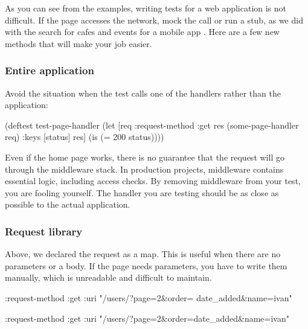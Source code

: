 \fi


As you can see from the examples, writing tests for a web application is not difficult. If the page accesses the network, mock the call or run a stub, as we did with the search for cafes and events for a mobile app . Here are a few new methods that will make your job easier.

\subsubsection*{Entire application}

Avoid the situation when the test calls one of the handlers  rather than the application:

\begin{english}
  \begin{clojure/lines}
(deftest test-page-handler
  (let [req {:request-method :get}
        res (some-page-handler req)
        {:keys [status]} res]
    (is (= 200 status))))
  \end{clojure/lines}
\end{english}

Even if the home page works, there is no guarantee that the request will go through the middleware stack. In production projects, middleware contains essential logic, including access checks. By removing middleware from your test, you are fooling yourself. The handler you are testing should be as close as possible to the actual application.

\subsubsection*{Request library}

Above, we declared the request as a map. This is useful when there are no parameters or a body. If the page needs parameters, you have to write them manually, which is unreadable and difficult to maintain.

\ifx\DEVICETYPE\MOBILE

\begin{english}
  \begin{clojure}
{:request-method :get
 :uri
 "/users/?page=2&order=
                 date_added&name=ivan"}
  \end{clojure}
\end{english}

\else

\begin{english}
  \begin{clojure}
{:request-method :get
 :uri "/users/?page=2&order=date_added&name=ivan"}
  \end{clojure}
\end{english}

